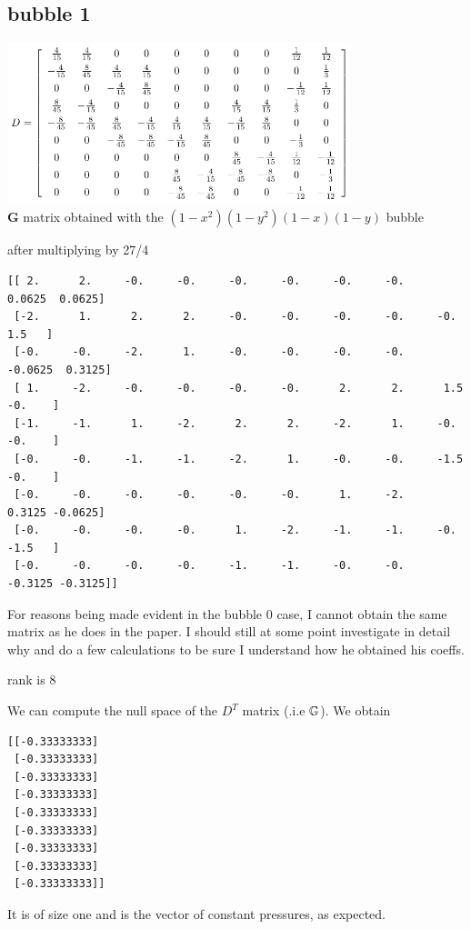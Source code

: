 \newpage
\subsection*{bubble 1}

\begin{center}
\includegraphics[width=10cm]{python_codes/fieldstone_72/images/mat2}\\
{\captionfont ${\bm G}$ matrix obtained with the $(1-x^2)(1-y^2)(1-x)(1-y)$ bubble}
\end{center}

after multiplying by 27/4
\begin{verbatim}
[[ 2.      2.     -0.     -0.     -0.     -0.     -0.     -0.      0.0625  0.0625]
 [-2.      1.      2.      2.     -0.     -0.     -0.     -0.     -0.      1.5   ]
 [-0.     -0.     -2.      1.     -0.     -0.     -0.     -0.     -0.0625  0.3125]
 [ 1.     -2.     -0.     -0.     -0.     -0.      2.      2.      1.5    -0.    ]
 [-1.     -1.      1.     -2.      2.      2.     -2.      1.     -0.     -0.    ]
 [-0.     -0.     -1.     -1.     -2.      1.     -0.     -0.     -1.5    -0.    ]
 [-0.     -0.     -0.     -0.     -0.     -0.      1.     -2.      0.3125 -0.0625]
 [-0.     -0.     -0.     -0.      1.     -2.     -1.     -1.     -0.     -1.5   ]
 [-0.     -0.     -0.     -0.     -1.     -1.     -0.     -0.     -0.3125 -0.3125]]
\end{verbatim}

For reasons being made evident in the bubble 0 case, I cannot obtain the same 
matrix as he does in the paper. I should still at some point investigate in detail why
and do a few calculations to be sure I understand how he obtained his coeffs. 

rank is 8

We can compute the null space of the $D^T$ matrix (.i.e ${\mathbb{G}}$).
We obtain
\begin{verbatim}
[[-0.33333333]
 [-0.33333333]
 [-0.33333333]
 [-0.33333333]
 [-0.33333333]
 [-0.33333333]
 [-0.33333333]
 [-0.33333333]
 [-0.33333333]]
\end{verbatim}
It is of size one and is the vector of constant pressures, as expected.


